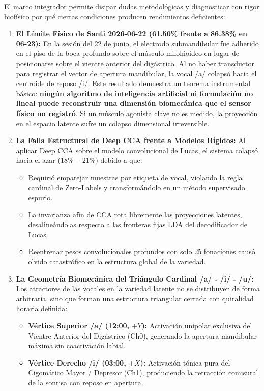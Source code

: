 \documentclass[11pt,a4paper]{article}
\begin{document}
El marco integrador permite disipar dudas metodológicas y diagnosticar con rigor biofísico por qué ciertas condiciones producen rendimientos deficientes:
\begin{enumerate}
    \item \textbf{El Límite Físico de Santi 2026-06-22 (61.50\% frente a 86.38\% en 06-23):}
    En la sesión del 22 de junio, el electrodo submandibular fue adherido en el piso de la boca profundo sobre el músculo milohioideo en lugar de posicionarse sobre el vientre anterior del digástrico. Al no haber transductor para registrar el vector de apertura mandibular, la vocal /a/ colapsó hacia el centroide de reposo /i/. Este resultado demuestra un teorema instrumental básico: \textbf{ningún algoritmo de inteligencia artificial ni formulación no lineal puede reconstruir una dimensión biomecánica que el sensor físico no registró}. Si un músculo agonista clave no es medido, la proyección en el espacio latente sufre un colapso dimensional irreversible.
    \item \textbf{La Falla Estructural de Deep CCA frente a Modelos Rígidos:}
    Al aplicar Deep CCA sobre el modelo convolucional de Lucas, el sistema colapsó hacia el azar ($18\% - 21\%$) debido a que:
    \begin{itemize}
        \item Requirió emparejar muestras por etiqueta de vocal, violando la regla cardinal de Zero-Labels y transformándolo en un método supervisado espurio.
        \item La invarianza afín de CCA rota libremente las proyecciones latentes, desalineándolas respecto a las fronteras fijas LDA del decodificador de Lucas.
        \item Reentrenar pesos convolucionales profundos con solo 25 fonaciones causó olvido catastrófico en la estructura global de la variedad.
    \end{itemize}
    \item \textbf{La Geometría Biomecánica del Triángulo Cardinal /a/ - /i/ - /u/:}
    Los atractores de las vocales en la variedad latente no se distribuyen de forma arbitraria, sino que forman una estructura triangular cerrada con quiralidad horaria definida:
    \begin{itemize}
        \item \textbf{Vértice Superior /a/ (12:00, $+Y$):} Activación unipolar exclusiva del Vientre Anterior del Digástrico (Ch0), generando la apertura mandibular máxima sin coactivación labial.
        \item \textbf{Vértice Derecho /i/ (03:00, $+X$):} Activación tónica pura del Cigomático Mayor / Depresor (Ch1), produciendo la retracción comisural de la sonrisa con reposo en apertura.

\end{itemize}
\end{enumerate}
\end{document}
